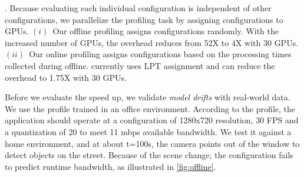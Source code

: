 . Because
evaluating each individual configuration is independent of other configurations,
we parallelize the profiling task by assigning configurations to GPUs.
$(i)$~Our offline profiling assigns configurations randomly.
With the increased number of GPUs, the overhead reduces from 52X to 4X with 30 GPUs.
$(ii)$~Our online profiling assigns configurations based on the processing times collected during offline.
\sysname{} currently uses LPT assignment and can reduce the overhead to 1.75X with 30 GPUs.

Before we evaluate the speed up, we validate
\textit{model drifts} with real-world data. We use the profile
trained in an office environment.
According to the profile, the application should operate at a configuration of 1280x720 resolution, 30 FPS and a quantization of 20 to meet 11 mbps available bandwidth.
We test it against a home environment, and at about t=100s, the camera points out
of the window to detect objects on the street. Because of the scene change, the
configuration fails to predict runtime bandwidth, as illustrated in
\autoref{fig:offline}.


